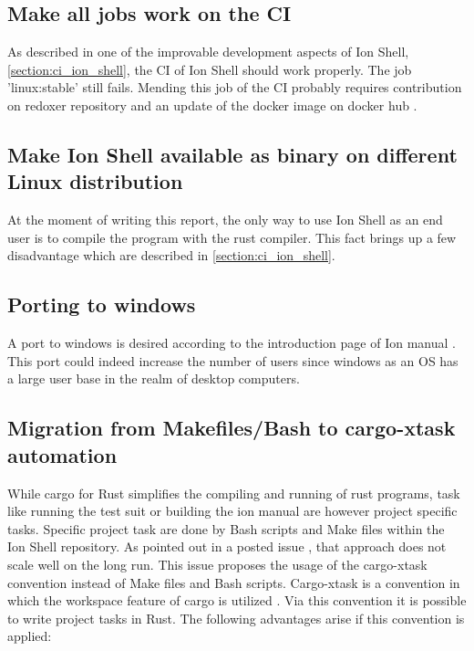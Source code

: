 \subsection{Make all jobs work on the CI}

As described in one of the improvable development aspects of Ion Shell, \ref{section:ci_ion_shell},
the CI of Ion Shell should work properly.
The job 'linux:stable' still fails.
Mending this job of the CI probably requires contribution
on redoxer repository \cite{link_repos_redoxer} and
an update of the docker image on docker hub \cite{docker_hub_redoxer}.

\subsection{Make Ion Shell available as binary on different Linux distribution}

At the moment of writing this report,
the only way to use Ion Shell as an end user is to compile the program with the rust compiler.
This fact brings up a few disadvantage which are described in \ref{section:ci_ion_shell}.

\subsection{Porting to windows}

A port to windows is desired according to the introduction page of Ion manual \cite{ion_manual_instroduction}.
This port could indeed increase the number of users since windows
as an OS has a large user base in the realm of desktop computers.

\subsection{Migration from Makefiles/Bash to cargo-xtask automation}

While cargo for Rust simplifies the compiling and running of rust programs,
task like running the test suit or building the ion manual are however project specific tasks.
Specific project task are done by Bash scripts and Make files within the Ion Shell repository.
As pointed out in a posted issue \cite{issue_convert_make_files_to_xtask},
that approach does not scale well on the long run.
This issue proposes the usage of the cargo-xtask convention instead of Make files and Bash scripts.
Cargo-xtask is a convention in which the workspace feature of cargo is utilized \cite{repos_cargo_xtask}.
Via this convention it is possible to write project tasks in Rust.
The following advantages arise if this convention is applied:

